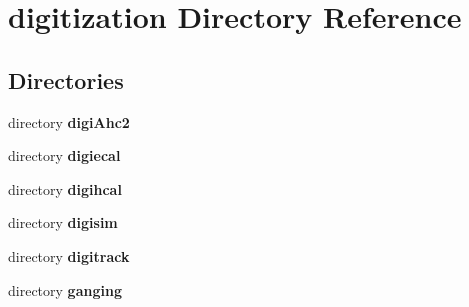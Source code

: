 \section{digitization Directory Reference}
\label{dir_7cb8123b938c96662aea1c484b2b5ffe}
\subsection*{Directories}
\begin{DoxyCompactItemize}
\item 
directory {\bf digi\-Ahc2}
\item 
directory {\bf digiecal}
\item 
directory {\bf digihcal}
\item 
directory {\bf digisim}
\item 
directory {\bf digitrack}
\item 
directory {\bf ganging}
\end{DoxyCompactItemize}
